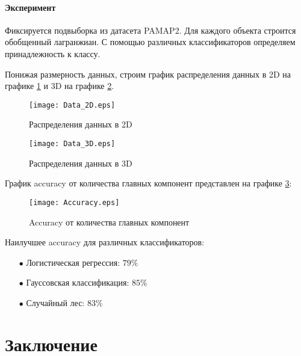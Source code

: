 \documentclass[12pt, twoside]{article}
\begin{document}
    \paragraph{Эксперимент \cite{experiment, master-tesis}}

        Фиксируется подвыборка из датасета PAMAP2. Для каждого объекта строится обобщенный лагранжиан. С помощью различных классификаторов определяем принадлежность к классу.
        
        Понижая размерность данных, строим график распределения данных в 2D на графике \ref{fig: 2D} и 3D на графике \ref{fig: 3D}.

        \begin{figure}[H]
            \centering
            \texttt{[image: Data\_2D.eps]}
            \caption{Распределения данных в 2D}
            \label{fig: 2D}
        \end{figure}

        \begin{figure}[H]
            \centering
            \texttt{[image: Data\_3D.eps]}
            \caption{Распределения данных в 3D}
            \label{fig: 3D}
        \end{figure}

        График accuracy от количества главных компонент представлен на графике \ref{fig: accuracy}:

        \begin{figure}[H]
            \centering
            \texttt{[image: Accuracy.eps]}
            \caption{Accuracy от количества главных компонент}
            \label{fig: accuracy}
        \end{figure}

        Наилучшее accuracy для различных классификаторов:
        \begin{itemize}

            \item[$\bullet$] Логистическая регрессия: $79\%$

            \item[$\bullet$] Гауссовская классификация: $85\%$

            \item[$\bullet$] Случайный лес: $83\%$

        \end{itemize}

\section{Заключение}
\end{document}
